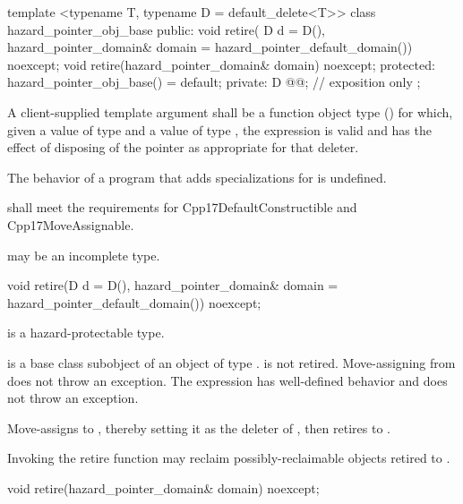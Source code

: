 \begin{codeblock}
template <typename T, typename D = default_delete<T>>
class hazard_pointer_obj_base {
public:
  void retire(
    D d = D(),
    hazard_pointer_domain& domain = hazard_pointer_default_domain()) noexcept;
  void retire(hazard_pointer_domain& domain) noexcept;
protected:
  hazard_pointer_obj_base() = default;
private:
  D @@; // exposition only
};
\end{codeblock}

\pnum
A client-supplied template argument  shall be a function object type ()
for which, given a value  of type  and a value  of type , the expression  is valid and has the effect of disposing of the pointer as appropriate for that deleter.

\pnum
The behavior of a program that adds specializations for  is undefined.

\pnum
{} shall meet the requirements for Cpp17DefaultConstructible and Cpp17MoveAssignable.

\pnum
{} may be an incomplete type.

\begin{itemdecl}
void retire(D d = D(), hazard_pointer_domain& domain = hazard_pointer_default_domain()) noexcept;
\end{itemdecl}

\begin{itemdescr}

\pnum
\mandates
{} is a hazard-protectable type.

\pnum
\expects
{} is a base class subobject of an object  of type .  is not retired.
Move-assigning  from  does not throw an exception. The expression  has well-defined behavior and does not throw an exception.

\pnum
\effects 
Move-assigns  to , thereby setting it as the deleter of , then retires 
to .

\pnum
Invoking the retire function may reclaim possibly-reclaimable objects retired to .

\end{itemdescr}

\begin{itemdecl}
void retire(hazard_pointer_domain& domain) noexcept;
\end{itemdecl}

